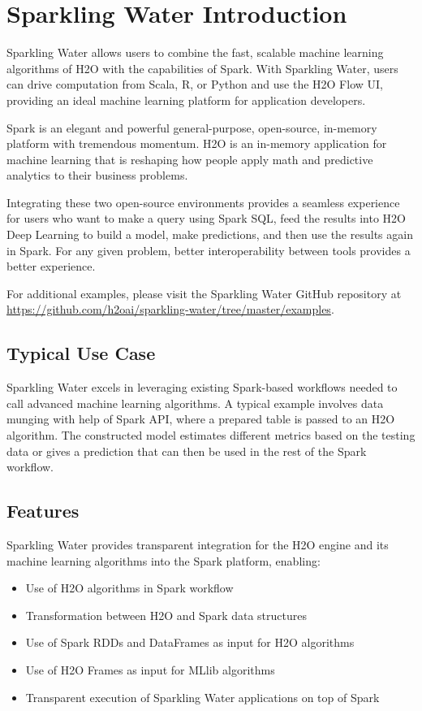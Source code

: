 \documentclass{standalone}
\begin{document}
\section{Sparkling Water Introduction}

Sparkling Water allows users to combine the fast, scalable machine learning algorithms of H2O with the capabilities of Spark. With Sparkling Water, users can drive computation from Scala, R, or Python and use the H2O Flow UI, providing an ideal machine learning platform for application developers.

Spark is an elegant and powerful general-purpose, open-source, in-memory platform with tremendous momentum. H2O is an in-memory application for machine learning that is reshaping how people apply math and predictive analytics to their business problems.

Integrating these two open-source environments provides a seamless experience for users who want to make a query using Spark SQL, feed the results into H2O Deep Learning to build a model, make predictions, and then use the results again in Spark. For any given problem, better interoperability between tools provides a better experience. 

For additional examples, please visit the Sparkling Water GitHub repository at {\url{https://github.com/h2oai/sparkling-water/tree/master/examples}}. 

\subsection{Typical Use Case}
Sparkling Water excels in leveraging existing Spark-based workflows needed to call advanced machine learning algorithms. A typical example involves data munging with help of Spark API, where a prepared table is passed to an H2O algorithm. The constructed model estimates different metrics based on the testing data or gives a prediction that can then be used in the rest of the Spark workflow.

\subsection{Features}

Sparkling Water provides transparent integration for the H2O engine and its machine learning algorithms into the Spark platform, enabling:

\begin{itemize}

 \item Use of H2O algorithms in Spark workflow
 \item Transformation between H2O and Spark data structures
 \item Use of Spark RDDs and DataFrames as input for H2O algorithms
 \item Use of H2O Frames as input for MLlib algorithms
 \item Transparent execution of Sparkling Water applications on top of Spark
\end{itemize}
\end{document}
